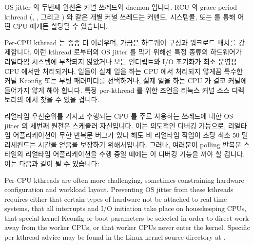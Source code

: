 OS jitter 의 두번째 원천은 커널 쓰레드와 daemon 입니다.
RCU 의 grace-period kthread (, , 그리고
) 와 같은 개별 커널 쓰레드는  커맨드,
 시스템콜, 또는  를 통해 어떤 CPU 에게든
할당될 수 있습니다.

Per-CPU kthread 는 종종 더 어려우며, 가끔은 하드웨어 구성과 워크로드 배치를
강제합니다.
이런 kthread 로부터의 OS jitter 를 막기 위해선 특정 종류의 하드웨어가 리얼타임
시스템에 부착되지 않았거나 모든 인터럽트와 I/O 초기화가 최소 운영용 CPU 에서만
처리되거나, 일들이 실제 일을 하는 CPU 에서 처리되지 않게끔 특수한 커널 Kconfig
또는 부팅 패러미터를 선택하거나, 실제 일을 하는 CPU 가 결코 커널에 들어가지
않게 해야 합니다.
특정 per-kthread 를 위한 조언을 리눅스 커널 소스 
디렉토리의  에서 찾을 수 있을
겁니다.

리얼타임 우선순위를 가지고 수행되는 CPU 를 주로 사용하는 쓰레드에 대한 OS
jitter 의 세번째 원천은 스케쥴러 자신입니다.
이는 의도적인 디버깅 기능으로, 리얼타임 어플리케이션이 무한 반복문 버그가 있다
해도 비 리얼타임 작업이 초당 최소 50 밀리세컨드는 시간을 얻음을 보장하기
위해서입니다.
그러나, 여러분이 polling 반복문 스타일의 리얼타임 어플리케이션을 수행 중일
때에는 이 디버깅 기능을 꺼야 할 겁니다.
이는 다음과 같이 될 수 있습니다:

\iffalse

Per-CPU kthreads are often more challenging, sometimes constraining
hardware configuration and workload layout.
Preventing OS jitter from these kthreads requires either that certain
types of hardware
not be attached to real-time systems, that all interrupts and I/O
initiation take place on housekeeping CPUs, that special kernel
Kconfig or boot parameters be selected in order to direct work away from
the worker CPUs, or that worker CPUs never enter the kernel.
Specific per-kthread advice may be found in the Linux kernel source
 directory at
.

